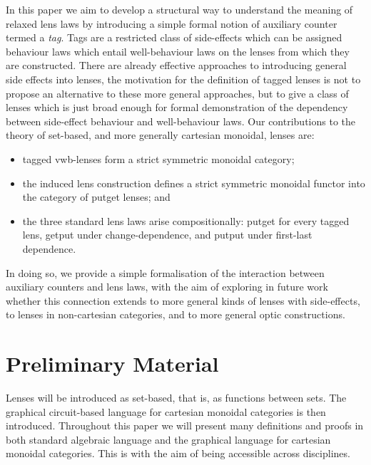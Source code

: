 \documentclass[a4paper,11pt]{article}
\theoremstyle{definition}
\theoremstyle{plain}
\theoremstyle{plain}
\theoremstyle{definition}
\begin{document}
In this paper we aim to develop a structural way to understand the meaning of relaxed lens laws by introducing a simple formal notion of auxiliary counter termed a \textit{tag}. Tags are a restricted class of side-effects which can be assigned behaviour laws which entail well-behaviour laws on the lenses from which they are constructed. There are already effective approaches \cite{abou_monads, monadic_combinator, monads_entangled_notions, monadic_composing} to introducing general side effects into lenses, the motivation for the definition of tagged lenses is not to propose an alternative to these more general approaches, but to give a class of lenses which is just broad enough for formal demonstration of the dependency between side-effect behaviour and well-behaviour laws. Our contributions to the theory of set-based, and more generally cartesian monoidal, lenses are:
\begin{itemize}
    \item tagged vwb-lenses form a strict symmetric monoidal category;
    \item the induced lens construction defines a strict symmetric monoidal functor into the category of putget lenses; and
    \item the three standard lens laws arise compositionally: putget for every tagged lens, getput under change-dependence, and putput under first-last dependence.
\end{itemize}
In doing so, we provide a simple formalisation of the interaction between auxiliary counters and lens laws, with the aim of exploring in future work whether this connection extends to more general kinds of lenses with side-effects, to lenses in non-cartesian categories, and to more general optic constructions. 


\section{Preliminary Material}
Lenses will be introduced as set-based, that is, as functions between sets. The graphical circuit-based language for cartesian monoidal categories is then introduced. Throughout this paper we will present many definitions and proofs in both standard algebraic language and the graphical language for cartesian monoidal categories. This is with the aim of being accessible across disciplines.
\end{document}
